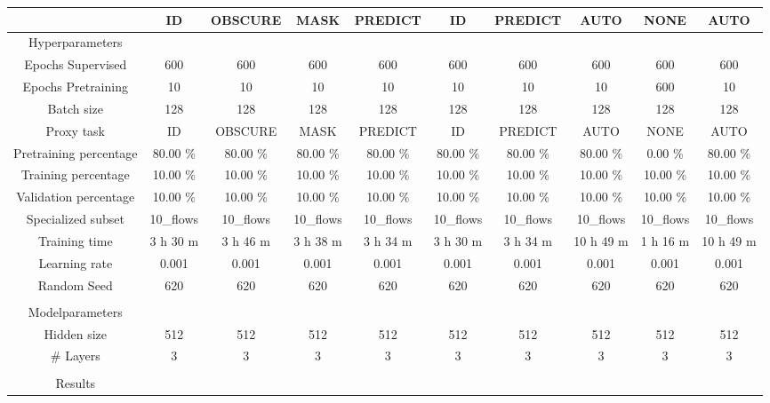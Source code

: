 \begin{table}[htb]
    \centering
    \begin{tabular}{@{}cccccccccc@{}}
        \toprule
         &  ID &  OBSCURE &  MASK &  PREDICT &  ID &  PREDICT &  AUTO &  NONE &  AUTO \\
        \midrule
        Hyperparameters &  &  &  &  &  &  &  &  &  \\
        Epochs Supervised &  600 &  600 &  600 &  600 &  600 &  600 &  600 &  600 &  600 \\
        Epochs Pretraining &  10 &  10 &  10 &  10 &  10 &  10 &  10 &  600 &  10 \\
        Batch size &  128 &  128 &  128 &  128 &  128 &  128 &  128 &  128 &  128 \\
        Proxy task &  ID &  OBSCURE &  MASK &  PREDICT &  ID &  PREDICT &  AUTO &  NONE &  AUTO \\
        Pretraining percentage &  80.00 \% &  80.00 \% &  80.00 \% &  80.00 \% &  80.00 \% &  80.00 \% &  80.00 \% &  0.00 \% &  80.00 \% \\
        Training percentage &  10.00 \% &  10.00 \% &  10.00 \% &  10.00 \% &  10.00 \% &  10.00 \% &  10.00 \% &  10.00 \% &  10.00 \% \\
        Validation percentage &  10.00 \% &  10.00 \% &  10.00 \% &  10.00 \% &  10.00 \% &  10.00 \% &  10.00 \% &  10.00 \% &  10.00 \% \\
        Specialized subset &  10\_flows &  10\_flows &  10\_flows &  10\_flows &  10\_flows &  10\_flows &  10\_flows &  10\_flows &  10\_flows \\
        Training time &  3 h 30 m &  3 h 46 m &  3 h 38 m &  3 h 34 m &  3 h 30 m &  3 h 34 m &  10 h 49 m &  1 h 16 m &  10 h 49 m \\
        Learning rate &  0.001 &  0.001 &  0.001 &  0.001 &  0.001 &  0.001 &  0.001 &  0.001 &  0.001 \\
        Random Seed &  620 &  620 &  620 &  620 &  620 &  620 &  620 &  620 &  620 \\
         \\
        Modelparameters &  &  &  &  &  &  &  &  &  \\
        Hidden size &  512 &  512 &  512 &  512 &  512 &  512 &  512 &  512 &  512 \\
        \# Layers &  3 &  3 &  3 &  3 &  3 &  3 &  3 &  3 &  3 \\
         \\
        Results &  &  &  &  &  &  &  &  &  \\

\end{tabular}
\end{table}
